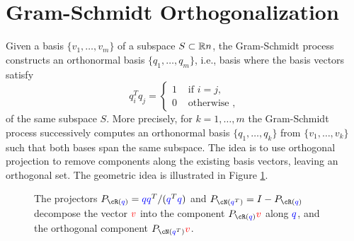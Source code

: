 \documentclass{article}
\providecommand{\real}[1]{\mathbb{R}}
\begin{document}
\section{Gram-Schmidt Orthogonalization}   \label{sec:gram-schmidt}




Given a basis $\{ v_1, \ldots, v_m\}$ of a subspace $S \subset \real^n$, the Gram-Schmidt process
constructs an orthonormal basis $\{ q_1, \ldots, q_m\}$, i.e., basis where the basis vectors satisfy
\[
          q_i^T q_j = \left\{ \begin{array}{ll}
                                       1 & \mbox{ if } i=j, \\
                                       0 & \mbox{ otherwise },
                               \end{array} \right.
\]
of the same subspace $S$.
More precisely, for $k = 1, \ldots, m$ the Gram-Schmidt process successively computes  an orthonormal 
basis $\{ q_1, \ldots, q_k\}$ from $\{ v_1, \ldots, v_k\}$ such that both bases span the same subspace.
The idea is to use orthogonal projection to remove components along the existing basis vectors, 
leaving an orthogonal set. The geometric idea is illustrated in Figure \ref{fig:gram-schmidt-proj}.


\begin{figure}[!h]
\begin{center}
\end{center}
\caption{The projectors $P_{\cR({\color{blue} q})}={\color{blue}
q}{\color{blue} q}^T/({\color{blue} q}^T{\color{blue} q})$ and
$P_{\cN({\color{blue} q}^T)}=I-P_{\cR({\color{blue} q})}$ decompose
the vector ${\color{red} v}$ into the component $P_{\cR({\color{blue}
q})}{\color{red} v}$ along ${\color{blue} q}$, and the orthogonal
component $P_{\cN({\color{blue} q}^T)}{\color{red} v}$.}
\label{fig:gram-schmidt-proj}
\end{figure}
\end{document}
